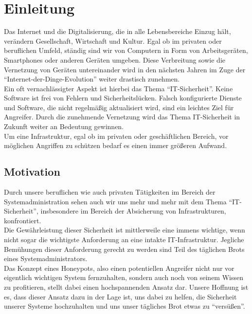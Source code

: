 \chapter{Einleitung}
\label{sec:einleitung}

Das Internet und die Digitalisierung, die in alle Lebensbereiche Einzug hält, verändern Gesellschaft, Wirtschaft und Kultur. Egal ob im privaten oder beruflichen Umfeld, ständig sind wir von Computern in Form von Arbeitsgeräten, Smartphones oder anderen Geräten umgeben. Diese Verbreitung sowie die Vernetzung von Geräten untereinander wird in den nächsten Jahren im Zuge der "`Internet-der-Dinge-Evolution"' weiter drastisch zunehmen.\\

Ein oft vernachlässigter Aspekt ist hierbei das Thema "`IT-Sicherheit"'. Keine Software ist frei von Fehlern und Sicherheitslücken. Falsch konfigurierte Dienste und Software, die nicht regelmäßig aktualisiert wird, sind ein leichtes Ziel für Angreifer. Durch die zunehmende Vernetzung wird das Thema IT-Sicherheit in Zukunft weiter an Bedeutung gewinnen.\\

Um eine Infrastruktur, egal ob im privaten oder geschäftlichen Bereich, vor möglichen Angriffen zu schützen bedarf es einen immer größeren Aufwand.


\section{Motivation}
\label{subsec:Motivation}

Durch unsere beruflichen wie auch privaten Tätigkeiten im Bereich der Systemadministration sehen auch wir uns mehr und mehr mit dem Thema "`IT-Sicherheit"', insbesondere im Bereich der Absicherung von Infrastrukturen, konfrontiert.\\

Die Gewährleistung dieser Sicherheit ist mittlerweile eine immens wichtige, wenn nicht sogar die wichtigste Anforderung an eine intakte IT-Infrastruktur. Jegliche Bemühungen dieser Anforderung gerecht zu werden sind Teil des täglichen Brots eines Systemadministrators.\\

Das Konzept eines Honeypots, also einen potentiellen Angreifer nicht nur vor eigentlich wichtigen System fernzuhalten, sondern auch noch von seinem Wissen zu profitieren, stellt dabei einen hochspannenden Ansatz dar. Unsere Hoffnung ist es, dass dieser Ansatz dazu in der Lage ist, uns dabei zu helfen, die Sicherheit unserer Systeme hochzuhalten und uns unser tägliches Brot etwas zu "`versüßen"'.


